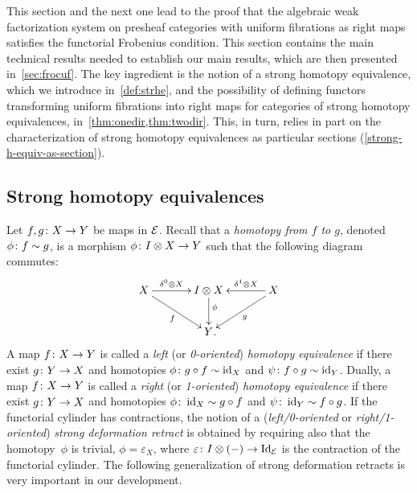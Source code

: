 \documentclass[reqno,10pt,a4paper,oneside,draft]{amsart}
\begin{document}
This section and the next one lead to the
proof that the algebraic weak factorization system on presheaf categories
with uniform fibrations as right maps satisfies the functorial Frobenius condition.
This section contains the main technical results needed to establish 
our main results, which are then presented in~\cref{sec:frocuf}. The key ingredient is the notion of a 
strong homotopy equivalence, which we introduce in~\cref{def:strhe}, and the possibility 
of defining functors transforming uniform fibrations into right maps for  categories of
strong homotopy equivalences, in~\cref{thm:onedir,thm:twodir}. This, in turn, 
relies in part on the characterization of strong homotopy equivalences
 as particular sections (\cref{strong-h-equiv-as-section}). 



\subsection*{Strong homotopy equivalences}
Let $f, g \colon X \to Y$ be maps in $\mathcal{E}$.
Recall that a \emph{homotopy from $f$ to $g$}, denoted $\phi \colon f \sim g$, is a morphism $\phi \colon I \otimes X \to Y$ such that the following diagram commutes:
\begin{equation}
\label{equ:homotopy}
\begin{gathered}
\xymatrix@C=1.2cm{
  X
  \ar[r]^-{\lcyl \otimes X}
  \ar[dr]_{f}
&
  \interval \otimes X
  \ar[d]^(0.4){\phi}
&
  X
  \ar[dl]^{g}
  \ar[l]_-{\rcyl \otimes X}
\\&
  Y
\rlap{.}}
\end{gathered}
\end{equation}
A map $f \colon X \to Y$ is called a \emph{left} (or \emph{0-oriented}) \emph{homotopy equivalence} if there exist $g \colon Y \to X$ and homotopies $\phi \colon g \mathbin{\circ} f \sim \operatorname{id}_X $ and $\psi \colon f \mathbin{\circ} g \sim \operatorname{id}_Y$.
Dually, a map $f \colon X \to Y$ is called a \emph{right} (or \emph{1-oriented}) \emph{homotopy equivalence} if there exist $g \colon Y \to X$ and homotopies $\phi \colon \operatorname{id}_X \sim g \mathbin{\circ} f$ and $\psi \colon \operatorname{id}_Y \sim f \mathbin{\circ} g$.
If the functorial cylinder has contractions, the notion of a (\emph{left/0-oriented} or \emph{right/1-oriented}) \emph{strong deformation retract} is obtained by requiring also that the homotopy~$\phi$ is trivial, \ie $\phi = \varepsilon_X$, where $\varepsilon \colon I \otimes (-)
\to \operatorname{Id}_{\mathcal{E}}$ is the contraction of the functorial cylinder.
The following generalization of strong deformation retracts is  very important in our development.
\end{document}
